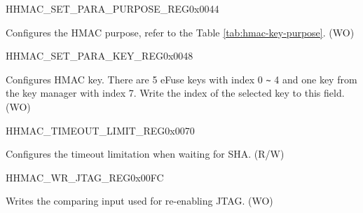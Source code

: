     \begin{register}{H}{HMAC\_SET\_PARA\_PURPOSE\_REG}{0x0044}\label{regdesc:HMACSETPARAPURPOSEREG}
    \regnewline%
    \begin{regdesc}\begin{reglist}
    \label{fielddesc:HMACPURPOSESET}\item [HMAC\_PURPOSE\_SET] Configures the HMAC purpose, refer to the Table \ref{tab:hmac-key-purpose}. (WO)
    \end{reglist}\end{regdesc}
    \end{register}


    \begin{register}{H}{HMAC\_SET\_PARA\_KEY\_REG}{0x0048}\label{regdesc:HMACSETPARAKEYREG}
    \regnewline%
    \begin{regdesc}\begin{reglist}
    \label{fielddesc:HMACKEYSET}\item [HMAC\_KEY\_SET] Configures HMAC key. There are 5 eFuse keys with index 0 \verb+~+ 4 and one key from the key manager with index 7. Write the index of the selected key to this field. (WO)
    \end{reglist}\end{regdesc}
    \end{register}


\begin{register}{H}{HMAC\_TIMEOUT\_LIMIT\_REG}{0x0070}\label{regdesc:HMACTIMEOUTLIMITREG}
%
\regnewline%
\begin{regdesc}\begin{reglist}
\label{fielddesc:HMACTIMEOUTLIMIT}\item [HMAC\_TIMEOUT\_LIMIT] Configures the timeout limitation when waiting for SHA. (R/W)
\end{reglist}\end{regdesc}
\end{register}


    \begin{register}{H}{HMAC\_WR\_JTAG\_REG}{0x00FC}\label{regdesc:HMACWRJTAGREG}
    \regnewline%
    \begin{regdesc}\begin{reglist}
    \label{fielddesc:HMACWRJTAG}\item [HMAC\_WR\_JTAG] Writes the comparing input used for re-enabling JTAG. (WO)
    \end{reglist}\end{regdesc}
    \end{register}


